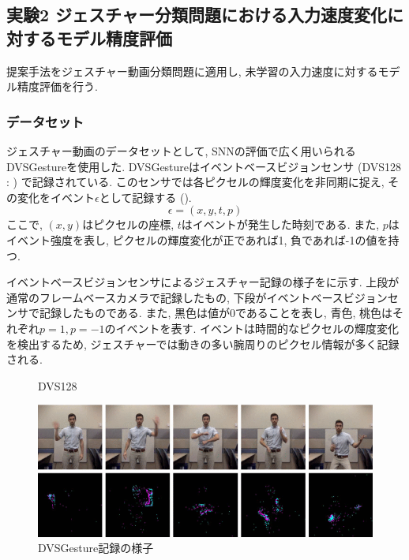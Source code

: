 \subsection{実験2 ジェスチャー分類問題における入力速度変化に対するモデル精度評価}
提案手法をジェスチャー動画分類問題に適用し, 未学習の入力速度に対するモデル精度評価を行う.

\subsubsection{データセット}
ジェスチャー動画のデータセットとして, SNNの評価で広く用いられる\cite{massa2020efficient}DVSGesture\cite{dvsgesture}を使用した.
DVSGestureはイベントベースビジョンセンサ (DVS128 : ) で記録されている.
このセンサでは各ピクセルの輝度変化を非同期に捉え, その変化をイベント$\epsilon$として記録する ().
\begin{equation}
    \epsilon = (x, y, t, p) \label{eq:dvs:event}
\end{equation}
ここで, $(x, y)$はピクセルの座標, $t$はイベントが発生した時刻である.
また, $p$はイベント強度を表し, ピクセルの輝度変化が正であれば1, 負であれば-1の値を持つ.

イベントベースビジョンセンサによるジェスチャー記録の様子をに示す.
上段が通常のフレームベースカメラで記録したもの, 下段がイベントベースビジョンセンサで記録したものである.
また, 黒色は値が0であることを表し, 青色, 桃色はそれぞれ$p=1, p=-1$のイベントを表す.
イベントは時間的なピクセルの輝度変化を検出するため, ジェスチャーでは動きの多い腕周りのピクセル情報が多く記録される.
\begin{figure}[htbp]
    \centering
    
    \caption{DVS128\cite{dvs128fig}}
    \label{fig:dvs128}
\end{figure}

\begin{figure}[htbp]
    \centering
    \includegraphics[width=1.0\textwidth]{Static/chap2_sec3_dvs_recordview.png}
    \caption{DVSGesture記録の様子\cite{dvsgesture}}
    \label{fig:dvs:recordview}
\end{figure}

